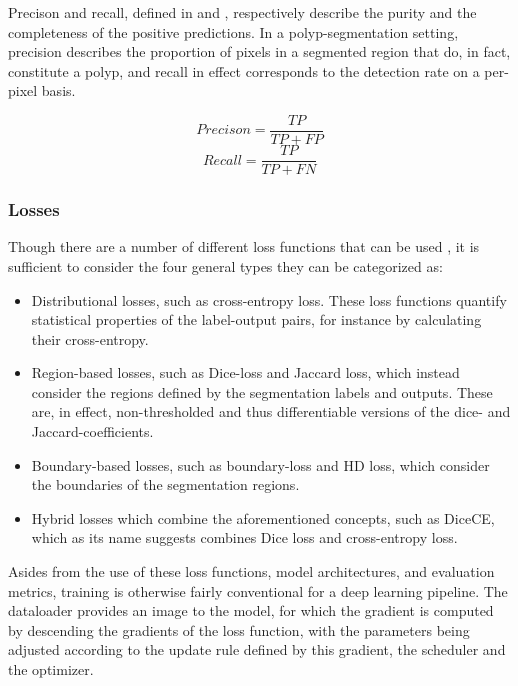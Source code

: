         Precison and recall, defined in  and , respectively describe the purity and the completeness of the positive predictions. In a polyp-segmentation setting, precision describes the proportion of pixels in a segmented region that do, in fact, constitute a polyp, and recall in effect corresponds to the detection rate on a per-pixel basis. 
        
        \begin{equation} \label{precison}
            Precison = \frac{TP}{TP+FP}
        \end{equation}
        \begin{equation} \label{recall}
            Recall = \frac{TP}{TP+FN}
        \end{equation}
    \subsubsection{Losses}
    Though there are a number of different loss functions that can be used \cite{semantic_segmentation_survey, seglosses}, it is sufficient to consider the four general types they can be categorized as:
    \begin{itemize}
        \item Distributional losses, such as cross-entropy loss. These loss functions quantify statistical properties of the label-output pairs, for instance by calculating their cross-entropy.
        
        \item Region-based losses, such as Dice-loss and Jaccard loss, which instead consider the regions defined by the segmentation labels and outputs. These are, in effect, non-thresholded and thus differentiable versions of the dice- and Jaccard-coefficients.
        
        \item Boundary-based losses, such as boundary-loss and HD loss, which consider the boundaries of the segmentation regions.
        
        \item Hybrid losses which combine the aforementioned concepts, such as DiceCE, which as its name suggests combines Dice loss and cross-entropy loss.
    \end{itemize}
 
Asides from the use of these loss functions, model architectures, and evaluation metrics, training is otherwise fairly conventional for a deep learning pipeline. The dataloader provides an image to the model, for which the gradient is computed by descending the gradients of the loss function, with the parameters being adjusted according to the update rule defined by this gradient, the scheduler and the optimizer. 

